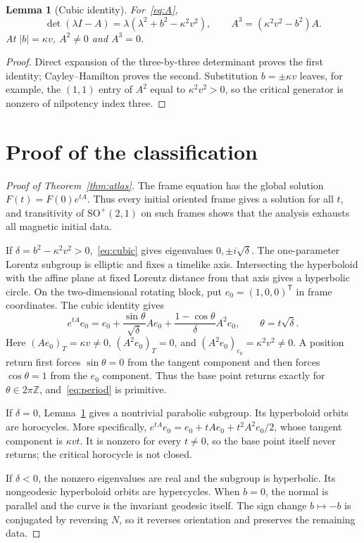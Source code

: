 \documentclass[10pt]{article}
\newtheorem{lemma}{Lemma}
\newcommand{\SO}{\mathrm{SO}^{+}(2,1)}
\begin{document}
\begin{lemma}[Cubic identity]\label{lem:cubic}
For~\eqref{eq:A},
\begin{equation}\label{eq:cubic}
 \det(\lambda I-A)=\lambda(\lambda^2+b^2-\kappa^2v^2),
 \qquad A^3=(\kappa^2v^2-b^2)A.
\end{equation}
At $|b|=\kappa v$, $A^2\ne0$ and $A^3=0$.
\end{lemma}
\begin{proof}
Direct expansion of the three-by-three determinant proves the first identity;
Cayley--Hamilton proves the second.  Substitution $b=\pm\kappa v$ leaves, for
example, the $(1,1)$ entry of $A^2$ equal to $\kappa^2v^2>0$, so the critical
generator is nonzero of nilpotency index three.
\end{proof}

\section{Proof of the classification}
\begin{proof}[Proof of Theorem~\ref{thm:atlas}]
The frame equation has the global solution $F(t)=F(0)e^{tA}$.  Thus every
initial oriented frame gives a solution for all $t$, and transitivity of
$\SO$ on such frames shows that the analysis exhausts all magnetic initial
data.

If $\delta=b^2-\kappa^2v^2>0$,~\eqref{eq:cubic} gives eigenvalues
$0,\pm i\sqrt\delta$.  The one-parameter Lorentz subgroup is elliptic and
fixes a timelike axis.  Intersecting the hyperboloid with the affine plane at
fixed Lorentz distance from that axis gives a hyperbolic circle.  On the
two-dimensional rotating block, put $e_0=(1,0,0)^{\mathsf T}$ in frame
coordinates.  The cubic identity gives
\[
 e^{tA}e_0=e_0+\frac{\sin\theta}{\sqrt\delta}Ae_0
 +\frac{1-\cos\theta}{\delta}A^2e_0,
 \qquad\theta=t\sqrt\delta.
\]
Here $(Ae_0)_T=\kappa v\ne0$, $(A^2e_0)_T=0$, and
$(A^2e_0)_{e_0}=\kappa^2v^2\ne0$.  A position return first forces
$\sin\theta=0$ from the tangent component and then forces
$\cos\theta=1$ from the $e_0$ component.  Thus the base point returns exactly
for $\theta\in2\pi\mathbb Z$, and~\eqref{eq:period} is primitive.

If $\delta=0$, Lemma~\ref{lem:cubic} gives a nontrivial parabolic subgroup.
Its hyperboloid orbits are horocycles.  More specifically,
$e^{tA}e_0=e_0+tAe_0+t^2A^2e_0/2$, whose tangent component is
$\kappa vt$.  It is nonzero for every $t\ne0$, so the base point itself never
returns; the critical horocycle is not closed.

If $\delta<0$, the nonzero eigenvalues are real and the subgroup is
hyperbolic.  Its nongeodesic hyperboloid orbits are hypercycles.  When $b=0$,
the normal is parallel and the curve is the invariant geodesic itself.  The
sign change $b\mapsto-b$ is conjugated by reversing $N$, so it reverses
orientation and preserves the remaining data.
\end{proof}
\end{document}
